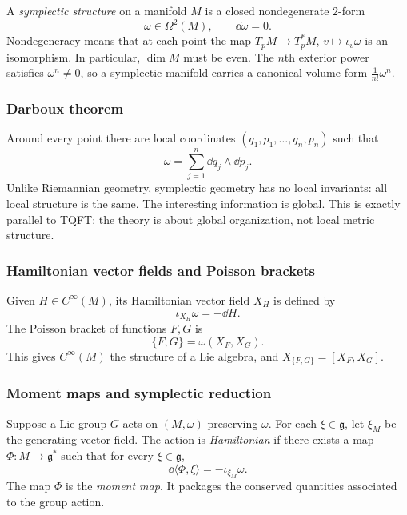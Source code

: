A \emph{symplectic structure} on a manifold $M$ is a closed nondegenerate $2$-form
\begin{equation}
  \omega \in \Omega^2(M),
  \qquad
  \dd\omega=0.
\end{equation}
Nondegeneracy means that at each point the map $T_pM \to T_p^*M$, $v \mapsto \iota_v\omega$ is an isomorphism. In particular, $\dim M$ must be even. The $n$th exterior power satisfies $\omega^n \neq 0$, so a symplectic manifold carries a canonical volume form $\frac{1}{n!}\omega^n$.

\subsubsection{Darboux theorem}

Around every point there are local coordinates $(q_1,p_1,\dots,q_n,p_n)$ such that
\begin{equation}
  \omega = \sum_{j=1}^n \dd q_j \wedge \dd p_j.
\end{equation}
Unlike Riemannian geometry, symplectic geometry has no local invariants: all local structure is the same. The interesting information is global. This is exactly parallel to TQFT: the theory is about global organization, not local metric structure.

\subsubsection{Hamiltonian vector fields and Poisson brackets}

Given $H\in C^\infty(M)$, its Hamiltonian vector field $X_H$ is defined by
\begin{equation}
  \iota_{X_H}\omega = -\dd H.
\end{equation}
The Poisson bracket of functions $F,G$ is
\begin{equation}
  \{F,G\}=\omega(X_F,X_G).
\end{equation}
This gives $C^\infty(M)$ the structure of a Lie algebra, and $X_{\{F,G\}}=[X_F,X_G]$.

\subsubsection{Moment maps and symplectic reduction}

Suppose a Lie group $G$ acts on $(M,\omega)$ preserving $\omega$. For each $\xi\in\mathfrak g$, let $\xi_M$ be the generating vector field. The action is \emph{Hamiltonian} if there exists a map $\Phi : M \to \mathfrak g^*$ such that for every $\xi\in\mathfrak g$,
\begin{equation}
  \dd\langle \Phi,\xi\rangle = -\iota_{\xi_M}\omega.
\end{equation}
The map $\Phi$ is the \emph{moment map}. It packages the conserved quantities associated to the group action.

